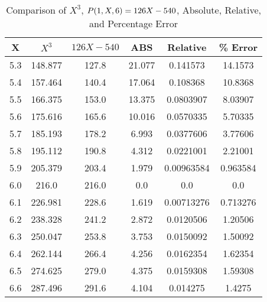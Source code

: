 ﻿\begin{table}[h!]
    \centering
    \caption{Comparison of $X^3$, ${P}(1,X,6) =126X-540$, Absolute, Relative, and Percentage Error}
    \begin{tabular}{|c|c|c|c|c|c|}
        \hline
        \textbf{X} & \textbf{$X^3$} & \textbf{$126X-540$} & \textbf{ABS} & \textbf{Relative} & \textbf{\% Error} \\ \hline
        5.3        & 148.877        & 127.8               & 21.077       & 0.141573          & 14.1573           \\ \hline
        5.4        & 157.464        & 140.4               & 17.064       & 0.108368          & 10.8368           \\ \hline
        5.5        & 166.375        & 153.0               & 13.375       & 0.0803907         & 8.03907           \\ \hline
        5.6        & 175.616        & 165.6               & 10.016       & 0.0570335         & 5.70335           \\ \hline
        5.7        & 185.193        & 178.2               & 6.993        & 0.0377606         & 3.77606           \\ \hline
        5.8        & 195.112        & 190.8               & 4.312        & 0.0221001         & 2.21001           \\ \hline
        5.9        & 205.379        & 203.4               & 1.979        & 0.00963584        & 0.963584          \\ \hline
        6.0        & 216.0          & 216.0               & 0.0          & 0.0               & 0.0               \\ \hline
        6.1        & 226.981        & 228.6               & 1.619        & 0.00713276        & 0.713276          \\ \hline
        6.2        & 238.328        & 241.2               & 2.872        & 0.0120506         & 1.20506           \\ \hline
        6.3        & 250.047        & 253.8               & 3.753        & 0.0150092         & 1.50092           \\ \hline
        6.4        & 262.144        & 266.4               & 4.256        & 0.0162354         & 1.62354           \\ \hline
        6.5        & 274.625        & 279.0               & 4.375        & 0.0159308         & 1.59308           \\ \hline
        6.6        & 287.496        & 291.6               & 4.104        & 0.014275          & 1.4275            \\ \hline

\end{tabular}
\end{table}
